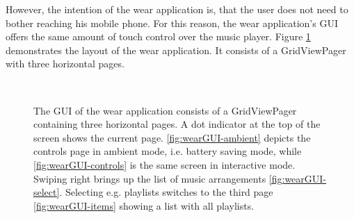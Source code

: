 However, the intention of the wear application is, that the user does not need to bother reaching his mobile phone. For this reason, the wear application's \ac{GUI} offers the same amount of touch control over the music player. Figure \ref{fig:wearGUI} demonstrates the layout of the wear application. It consists of a GridViewPager with three horizontal pages. 

\begin{figure}[bth]
	\myfloatalign
	 \quad
	 \quad
	 \\
	\caption{ The \ac{GUI} of the wear application consists of a GridViewPager containing three horizontal pages. A dot indicator at the top of the screen shows the current page. \ref{fig:wearGUI-ambient} depicts the controls page in ambient mode, i.e. battery saving mode, while \ref{fig:wearGUI-controls} is the same screen in interactive mode. Swiping right brings up the list of music arrangements \ref{fig:wearGUI-select}. Selecting e.g. playlists switches to the third page \ref{fig:wearGUI-items} showing a list with all playlists.}
	\label{fig:wearGUI}
\end{figure}

